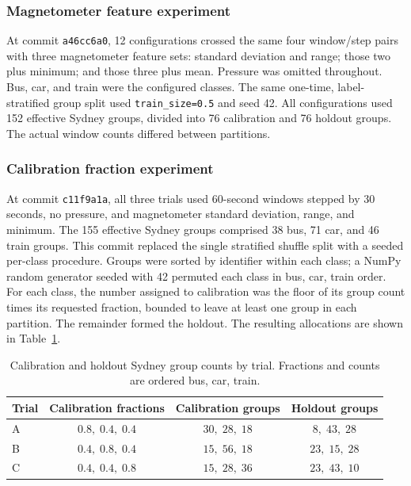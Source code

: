 \subsubsection{Magnetometer feature experiment}

At commit \texttt{a46cc6a0}, 12 configurations crossed the same four
window/step pairs with three magnetometer feature sets: standard deviation and
range; those two plus minimum; and those three plus mean. Pressure was omitted
throughout. Bus, car, and train were the configured classes. The same one-time,
label-stratified group split used \texttt{train\_size=0.5} and seed 42. All
configurations used 152 effective Sydney groups, divided into 76 calibration
and 76 holdout groups. The actual window counts differed between partitions.

\subsubsection{Calibration fraction experiment}

At commit \texttt{c11f9a1a}, all three trials used 60-second windows stepped
by 30 seconds, no pressure, and magnetometer standard deviation, range, and
minimum. The 155 effective Sydney groups comprised 38 bus, 71 car, and 46
train groups. This commit replaced the single stratified shuffle split with a
seeded per-class procedure. Groups were sorted by identifier within each
class; a NumPy random generator seeded with 42 permuted each class in bus,
car, train order. For each class, the number assigned to calibration was the
floor of its group count times its requested fraction, bounded to leave at
least one group in each partition. The remainder formed the holdout. The
resulting allocations are shown in Table~\ref{tab:preliminary-methodology-calibration}.

\begin{table}[htbp]
\centering
\small
\caption{Calibration and holdout Sydney group counts by trial. Fractions and
counts are ordered bus, car, train.}
\label{tab:preliminary-methodology-calibration}
\begin{tabular}{lccc}
\hline
\textbf{Trial} & \textbf{Calibration fractions} & \textbf{Calibration groups} & \textbf{Holdout groups} \\
\hline
A & $0.8,\;0.4,\;0.4$ & $30,\;28,\;18$ & $8,\;43,\;28$ \\
B & $0.4,\;0.8,\;0.4$ & $15,\;56,\;18$ & $23,\;15,\;28$ \\
C & $0.4,\;0.4,\;0.8$ & $15,\;28,\;36$ & $23,\;43,\;10$ \\
\hline
\end{tabular}
\end{table}


